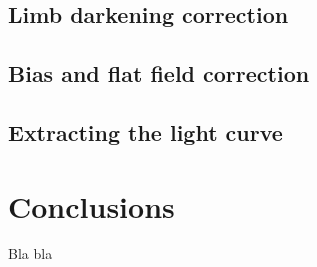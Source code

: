 \documentclass[a4paper,11pt,twocolumn]{article}
\begin{document}
\subsection{Limb darkening correction}

\subsection{Bias and flat field correction}

\subsection{Extracting the light curve}


\section{Conclusions}

Bla bla




\printbibliography
\end{document}
